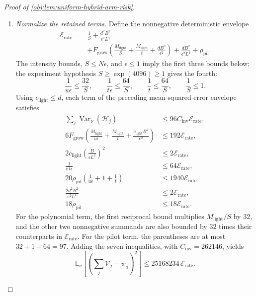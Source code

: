 \begin{proof}[Proof of \cref{obj:lem:uniform-hybrid-arm-risk}]
\begin{enumerate}
\item \textit{Normalize the retained terms.}
Define the nonnegative deterministic envelope
\[
\begin{aligned}
\mathscr E_{\mathrm{rate}}
={}&
\frac1S+\frac{d^2B^2}{\epsilon^2L^4}\\
&+F_{\mathrm{grow}}
\left(
\frac{M_{\mathrm{light}}}{S}
+\frac{M_{\mathrm{light}}}{t}
+\frac{dB^2}{\epsilon^2}
\right)
+\frac{dB^2}{\epsilon^2L^4}
+\rho_{\mathrm{pil}}.
\end{aligned}
\]
The intensity bounds, \(S\le N\epsilon\), and \(\epsilon\le1\) imply the first three bounds below; the experiment hypothesis \(S\ge\exp(4096)\ge1\) gives the fourth:
\[
\frac1{u\epsilon}\le\frac{32}{S},
\qquad
\frac1{t\epsilon}\le\frac{64}{S},
\qquad
\frac1t\le\frac{64}{S},
\qquad
\frac1S\le1.
\]
Using \(c_{\mathrm{light}}\le d\), each term of the preceding mean-squared-error envelope satisfies
\[
\begin{aligned}
\sum_j\operatorname{Var}_\nu(\mathcal H_j)
&\le96C_{\mathrm{inv}}\mathscr E_{\mathrm{rate}},\\
6F_{\mathrm{grow}}
\left(
\frac{M_{\mathrm{light}}}{u\epsilon}
+\frac{M_{\mathrm{light}}}{t}
+\frac{c_{\mathrm{light}}B^2}{\epsilon^2}
\right)
&\le192\mathscr E_{\mathrm{rate}},\\
2c_{\mathrm{light}}
\left(\frac B{\epsilon L^2}\right)^2
&\le2\mathscr E_{\mathrm{rate}},\\
\frac1{e\,t\epsilon}
&\le64\mathscr E_{\mathrm{rate}},\\
20\rho_{\mathrm{pil}}
\left(\frac1{u\epsilon}+1+\frac1t\right)
&\le1940\mathscr E_{\mathrm{rate}},\\
\frac{2d^2B^2}{\epsilon^2L^4}
&\le2\mathscr E_{\mathrm{rate}},\\
18\rho_{\mathrm{pil}}
&\le18\mathscr E_{\mathrm{rate}}.
\end{aligned}
\]
For the polynomial term, the first reciprocal bound multiplies
\(M_{\mathrm{light}}/S\) by \(32\), and the other two nonnegative summands are also bounded by \(32\) times their counterparts in \(\mathscr E_{\mathrm{rate}}\).
For the pilot term, the parentheses are at most \(32+1+64=97\).
Adding the seven inequalities, with \(C_{\mathrm{inv}}=262146\), yields
\[
\mathbb E_\nu\left[
\left(\sum_j\mathcal V_j-\psi_a\right)^2
\right]
\le25168234\,\mathscr E_{\mathrm{rate}}.
\]


\end{enumerate}
\end{proof}

